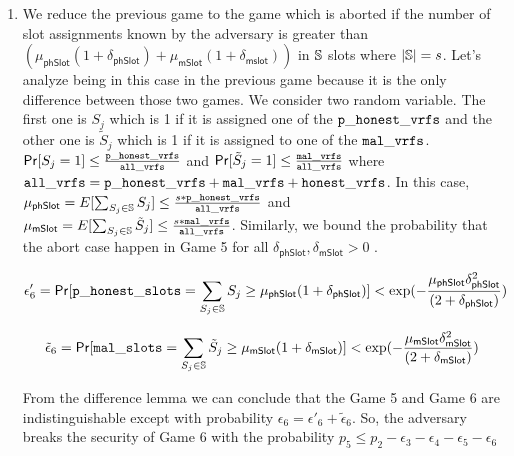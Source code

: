\begin{enumerate}[label={{Game }}{{\arabic*}}]
	\item We reduce the previous game to the game which is aborted if the number of slot assignments known by the adversary is greater than $ (\mu_{\mathsf{phSlot}}(1+\delta_{\mathsf{phSlot}})+ \mu_{\mathsf{mSlot}}(1+\delta_{\mathsf{mslot}})) $ in $ \mathbb{S} $ slots where $ |\mathbb{S}| = s $. Let's analyze being in this case in the previous game because it is the only difference between those two games. We consider two random variable. The first one is $ S_{j} $ which is 1 if it is assigned one of the $ \mathtt{p\_honest\_vrfs} $ and the other one is $ \tilde{S}_j $ which is 1 if it is assigned to one of the $ \mathtt{mal\_vrfs} $. $ \mathsf{Pr}[S_j = 1] \leq \frac{\mathtt{p\_honest\_vrfs}}{\mathtt{all\_vrfs}} $ and $  \mathsf{Pr}[\tilde{S}_j = 1]\leq \frac{\mathtt{mal\_vrfs}}{\mathtt{all\_vrfs}} $ where $ \mathtt{all\_vrfs} = \mathtt{p\_honest\_vrfs} + \mathtt{mal\_vrfs} + \mathtt{honest\_vrfs} $. In this case, $ \mu_{\mathsf{phSlot}} = E[\sum_{S_j \in \mathbb{S}} S_j] \leq \frac{s*\mathtt{p\_honest\_vrfs}}{\mathtt{all\_vrfs}}$ and $ \mu_{\mathsf{mSlot}} = E[\sum_{S_j \in \mathbb{S}} \tilde{S}_j] \leq \frac{s*\mathtt{mal\_vrfs}}{\mathtt{all\_vrfs}}$. Similarly, we bound the probability that the abort case happen in Game 5 for all $ \delta_{\mathsf{phSlot}}, \delta_{\mathsf{mSlot}} > 0 $ .
	
	\begin{equation}\label{eq:malvrf}
	\epsilon'_6 = \mathsf{Pr}[\mathtt{p\_honest\_slots} = \sum_{S_j \in \mathbb{S}} S_{j} \geq \mu_{\mathsf{phSlot}} (1+ \delta_{\mathsf{phSlot}})] < \exp(-\frac{\mu_{\mathsf{phSlot}}\delta_{\mathsf{phSlot}}^2}{(2+\delta_{\mathsf{phSlot}})}) \nonumber
	\end{equation}      
	
	 \begin{equation}\label{eq:malvrf}
	 \tilde{\epsilon}_6 = \mathsf{Pr}[\mathtt{mal\_slots} = \sum_{S_j \in \mathbb{S}} \tilde{S}_{j} \geq \mu_{\mathsf{mSlot}} (1+ \delta_{\mathsf{mSlot}})] < \exp(-\frac{\mu_{\mathsf{mSlot}}\delta_{\mathsf{mSlot}}^2}{(2+\delta_{\mathsf{mSlot}})}) \nonumber
	 \end{equation}   
	
	From the difference lemma we can conclude that the Game 5 and Game 6 are indistinguishable except with probability $ \epsilon_6 = \epsilon'_6  + \tilde{\epsilon}_6 $. So, the adversary breaks the security of Game 6 with the probability $ p_5 \leq p_2 - \epsilon_3  - \epsilon_4 - \epsilon_5 - \epsilon_6$   
	 

\end{enumerate}

